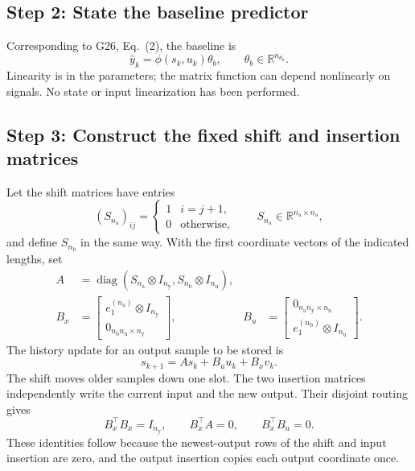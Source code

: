 \documentclass[11pt,a4paper]{article}
\newcommand{\R}{\mathbb R}
\newcommand{\diag}{\operatorname{diag}}
\begin{document}
\subsection*{Step 2: State the baseline predictor}
Corresponding to G26, Eq.\ (2), the baseline is
\begin{equation}\label{eq:baselineIO}
\hat y_k=\phi(s_k,u_k)\theta_b,\qquad \theta_b\in\R^{n_{\theta_{\mathrm b}}}.
\end{equation}
Linearity is in the parameters; the matrix function can depend nonlinearly on signals. No state or input linearization has been performed.

\subsection*{Step 3: Construct the fixed shift and insertion matrices}
Let the shift matrices have entries
\begin{equation}\label{eq:shifts}
(S_{n_{\mathrm a}})_{ij}=\begin{cases}1&i=j+1,\\0&\text{otherwise},\end{cases}
\qquad S_{n_{\mathrm a}}\in\R^{n_{\mathrm a}\times n_{\mathrm a}},
\end{equation}
and define \(S_{n_{\mathrm b}}\) in the same way. With the first coordinate vectors of the indicated lengths, set
\begin{equation}\label{eq:routing}
\begin{aligned}
A&=\diag(S_{n_{\mathrm a}}\otimes I_{n_{\mathrm y}},S_{n_{\mathrm b}}\otimes I_{n_{\mathrm u}}),\\
B_x&=\begin{bmatrix}e_1^{(n_{\mathrm a})}\otimes I_{n_{\mathrm y}}\\0_{n_{\mathrm b}n_{\mathrm u}\times n_{\mathrm y}}\end{bmatrix},&
B_u&=\begin{bmatrix}0_{n_{\mathrm a}n_{\mathrm y}\times n_{\mathrm u}}\\e_1^{(n_{\mathrm b})}\otimes I_{n_{\mathrm u}}\end{bmatrix}.
\end{aligned}
\end{equation}
The history update for an output sample to be stored is
\begin{equation}\label{eq:storage}
s_{k+1}=As_k+B_u u_k+B_xv_k.
\end{equation}
The shift moves older samples down one slot. The two insertion matrices independently write the current input and the new output. Their disjoint routing gives
\begin{equation}\label{eq:routingidentities}
B_x^\top B_x=I_{n_{\mathrm y}},\qquad B_x^\top A=0,\qquad B_x^\top B_u=0.
\end{equation}
These identities follow because the newest-output rows of the shift and input insertion are zero, and the output insertion copies each output coordinate once.
\end{document}
